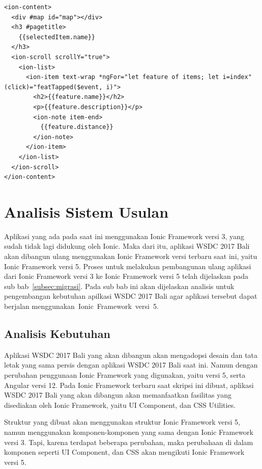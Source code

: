 \begin{enumerate}
\begin{itemize}
\begin{lstlisting}[label={lst:contentVenuesMap}, caption=\textit{Content} pada venues\textunderscore map.html]
<ion-content>
  <div #map id="map"></div>
  <h3 #pagetitle>
    {{selectedItem.name}}
  </h3>
  <ion-scroll scrollY="true">
    <ion-list>
      <ion-item text-wrap *ngFor="let feature of items; let i=index" (click)="featTapped($event, i)">
        <h2>{{feature.name}}</h2>
        <p>{{feature.description}}</p>
        <ion-note item-end>
          {{feature.distance}}
        </ion-note>
      </ion-item>
    </ion-list>
  </ion-scroll>
</ion-content>
\end{lstlisting}

	\end{itemize}
\end{enumerate}

\section{Analisis Sistem Usulan}
\label{sec:analisisSistemUsulan}

Aplikasi yang ada pada saat ini menggunakan Ionic Framework versi 3, yang sudah tidak lagi didukung oleh Ionic. Maka dari itu, aplikasi WSDC 2017 Bali akan dibangun ulang  menggunakan Ionic Framework versi terbaru saat ini, yaitu Ionic Framework versi 5. Proses untuk melakukan pembangunan ulang aplikasi dari Ionic Framework versi 3 ke Ionic Framework versi 5 telah dijelaskan pada sub bab~\ref{subsec:migrasi}. Pada sub bab ini akan dijelaskan analisis untuk pengembangan kebutuhan apilkasi WSDC 2017 Bali agar aplikasi tersebut dapat berjalan menggunakan~Ionic~Framework~versi~5.

\subsection{Analisis Kebutuhan}
\label{sec:analisisKebutuhanSistem}
Aplikasi WSDC 2017 Bali yang akan dibangun akan mengadopsi desain dan tata letak yang sama persis dengan aplikasi WSDC 2017 Bali saat ini. Namun dengan perubahan penggunaan Ionic Framework yang digunakan, yaitu versi 5, serta Angular versi 12. Pada Ionic Framework terbaru saat skripsi ini dibuat, aplikasi WSDC 2017 Bali yang akan dibangun akan memanfaatkan fasilitas yang disediakan oleh Ionic Framework, yaitu UI Component, dan CSS Utilities. 

Struktur yang dibuat akan menggunakan struktur Ionic Framework versi 5, namun menggunakan komponen-komponen yang sama dengan Ionic Framework versi 3. Tapi, karena terdapat beberapa perubahan, maka perubahaan di dalam komponen seperti UI Component, dan CSS akan mengikuti Ionic Framework versi 5. 

